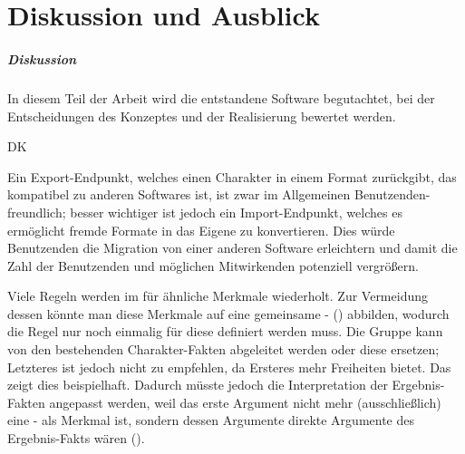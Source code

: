 \chapter{Diskussion und Ausblick}\label{ch:diskussion}

\paragraph{Diskussion}\label{par:diskussion}
In diesem Teil der Arbeit wird die entstandene Software begutachtet, bei der \insb Entscheidungen des Konzeptes und der Realisierung bewertet werden.

\begin{enumerateWithCode}{DK}

    \item Ein Export-Endpunkt, welches einen Charakter in einem Format zurückgibt, das kompatibel zu anderen Softwares ist, ist zwar im Allgemeinen Benutzenden-freundlich;
    besser \bzw wichtiger ist jedoch ein Import-Endpunkt, welches es ermöglicht fremde Formate in das Eigene zu konvertieren.
    Dies würde Benutzenden die Migration von einer anderen Software erleichtern und damit die Zahl der Benutzenden und möglichen Mitwirkenden potenziell vergrößern.


    \item Viele Regeln werden im  für ähnliche Merkmale wiederholt.
    Zur Vermeidung dessen könnte man diese Merkmale auf eine gemeinsame - () abbilden,
    wodurch die Regel nur noch einmalig für diese  definiert werden muss.
    Die Gruppe kann von den bestehenden Charakter-Fakten abgeleitet werden oder diese ersetzen; Letzteres ist jedoch nicht zu empfehlen, da Ersteres mehr Freiheiten bietet.
    Das  zeigt dies beispielhaft.
    Dadurch müsste jedoch die Interpretation der Ergebnis-Fakten angepasst werden, weil das erste Argument nicht mehr (ausschließlich) eine - als Merkmal ist, sondern dessen Argumente direkte Argumente des Ergebnis-Fakts wären (\vgl {}).


\end{enumerateWithCode}
